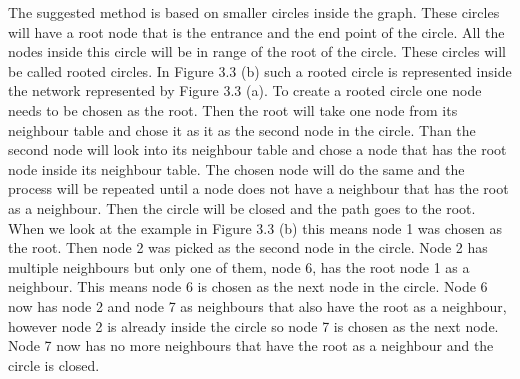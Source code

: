 The suggested method is based on smaller circles inside the graph. These circles will have a root node that is the entrance and the end point of the circle. All the nodes inside this circle will be in range of the root of the circle. These circles will be called rooted circles. In Figure 3.3 (b) such a rooted circle is represented inside the network represented by Figure 3.3 (a). To create a rooted circle one node needs to be chosen as the root. Then the root will take one node from its neighbour table and chose it as it as the second node in the circle.  Than the second node will look into its neighbour table and chose a node that has the root node inside its neighbour table. The chosen node will do the same and the process will be repeated until a node does not have a neighbour that has the root as a neighbour. Then the circle will be closed and the path goes to the root. When we look at the example in Figure 3.3 (b) this means node 1 was chosen as the root. Then node 2 was picked as the second node in the circle. Node 2 has multiple neighbours but only one of them, node 6, has the root node 1 as a neighbour. This means node 6 is chosen as the next node in the circle. Node 6 now has node 2 and node 7 as neighbours that also have the root as a neighbour, however node 2 is already inside the circle so node 7 is chosen as the next node. Node 7 now has no more neighbours that have the root as a neighbour and the circle is closed.

